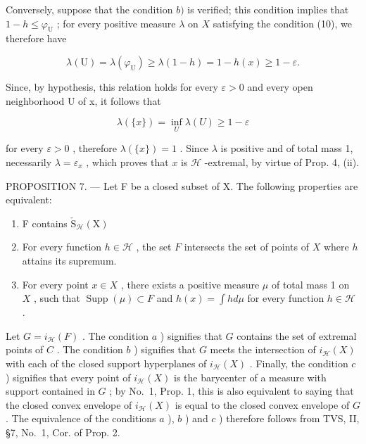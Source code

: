 Conversely, suppose that the condition \(b)\) is verified; this condition implies that \(1 - h \leqslant \varphi_{\mathrm{U}}\) ; for every positive measure \(\lambda\) on \(X\) satisfying the condition (10), we therefore have

\[
\lambda (\mathrm{U}) = \lambda (\varphi_ {\mathrm{U}}) \geqslant \lambda (1 - h) = 1 - h (x) \geqslant 1 - \varepsilon .
\]

Since, by hypothesis, this relation holds for every \(\varepsilon > 0\) and every open neighborhood U of x, it follows that

\[
\lambda (\{x \}) = \inf _ {U} \lambda (U) \geqslant 1 - \varepsilon
\]

for every \(\varepsilon > 0\) , therefore \(\lambda(\{x\}) = 1\) . Since \(\lambda\) is positive and of total mass 1, necessarily \(\lambda = \varepsilon_x\) , which proves that \(x\) is \(\mathcal{H}\) -extremal, by virtue of Prop. 4, (ii).

PROPOSITION 7. --- Let F be a closed subset of X. The following properties are equivalent:

\begin{enumerate}
\def\labelenumi{\alph{enumi})}
\item
  F contains \(\check{\mathrm{S}}_{\mathcal{H}}(\mathrm{X})\)
\item
  For every function \(h \in \mathcal{H}\) , the set \(F\) intersects the set of points of \(X\) where \(h\) attains its supremum.
\item
  For every point \(x \in X\) , there exists a positive measure \(\mu\) of total mass 1 on \(X\) , such that \(\operatorname{Supp}(\mu) \subset F\) and \(h(x) = \int h d\mu\) for every function \(h \in \mathcal{H}\) .
\end{enumerate}

Let \(G = i_{\mathcal{H}}(F)\) . The condition \(a\) ) signifies that \(G\) contains the set of extremal points of \(C\) . The condition \(b\) ) signifies that \(G\) meets the intersection of \(i_{\mathcal{H}}(X)\) with each of the closed support hyperplanes of \(i_{\mathcal{H}}(X)\) . Finally, the condition \(c\) ) signifies that every point of \(i_{\mathcal{H}}(X)\) is the barycenter of a measure with support contained in \(G\) ; by No.~1, Prop. 1, this is also equivalent to saying that the closed convex envelope of \(i_{\mathcal{H}}(X)\) is equal to the closed convex envelope of \(G\) . The equivalence of the conditions \(a\) ), \(b\) ) and \(c\) ) therefore follows from TVS, II, §7, No.~1, Cor. of Prop. 2.

